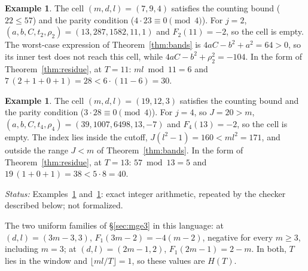\documentclass[11pt]{amsart}
\theoremstyle{plain}
\theoremstyle{definition}
\newtheorem{example}[theorem]{Example}
\theoremstyle{remark}
\newcommand{\status}[1]{\par\smallskip
  {\small\raggedright\noindent\textit{Status:} #1\par}\smallskip}
\begin{document}
\begin{example}\label{ex:794}
The cell $(m,d,l) = (7,9,4)$ satisfies the counting bound ($22 \le 57$) and the parity
condition ($4 \cdot 23 \equiv 0 \pmod 4$). For $j = 2$,
$(a,b,C,t_2,\rho_2) = (13,287,1582,11,1)$ and $F_2(11) = -2$, so the cell is empty. The
worst-case expression of Theorem~\ref{thm:bands} is $4aC - b^2 + a^2 = 64 > 0$, so its
inner test does not reach this cell, while $4aC - b^2 + \rho_2^2 = -104$. In the form
of Theorem~\ref{thm:residue}, at $T = 11$: $ml \bmod 11 = 6$ and
$7\,(2 + 1 + 0 + 1) = 28 < 6 \cdot (11 - 6) = 30$.
\end{example}

\begin{example}\label{ex:19123}
The cell $(m,d,l) = (19,12,3)$ satisfies the counting bound and the parity condition
($3 \cdot 28 \equiv 0 \pmod 4$). For $j = 4$, so $J = 20 > m$,
$(a,b,C,t_4,\rho_4) = (39,1007,6498,13,-7)$ and $F_4(13) = -2$, so the cell is empty. The
index lies inside the cutoff, $J(l^2-1) = 160 < ml^2 = 171$, and outside the range
$J < m$ of Theorem~\ref{thm:bands}. In the form of Theorem~\ref{thm:residue}, at
$T = 13$: $57 \bmod 13 = 5$ and $19\,(1 + 0 + 1) = 38 < 5 \cdot 8 = 40$.
\end{example}
\status{Examples~\ref{ex:794} and~\ref{ex:19123}: exact integer arithmetic, repeated by the checker
described below; not formalized.}

The two uniform families of \S\ref{sec:mge3} in this language: at $(d,l) = (3m-3,3)$,
$F_1(3m-2) = -4(m-2)$, negative for every $m \ge 3$, including $m = 3$; at
$(d,l) = (2m-1,2)$, $F_1(2m-1) = 2 - m$. In both, $T$ lies in the window and
$\lfloor ml/T \rfloor = 1$, so these values are $H(T)$.
\end{document}
